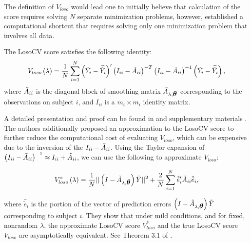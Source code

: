 \bigskip

The definition of $V_{loso}$ would lead one to initially believe that calculation of the score requires solving $N$ separate minimization problems, however, \cite{xu2012asymptotic} established a computational shortcut that requires solving only one minimization problem that involves all data. 
  
  \begin{lemma} \label{lemma:losocv-shortcut}
  The LosoCV score satisfies the following identity:
  \begin{equation*}
 V_{loso}\left( \lambda \right) = \frac{1}{N} \sum_{i = 1}^N \left(\tilde{Y}_i - \widehat{\tilde{Y}_i}\right)' \left(I_{ii} - \tilde{A}_{ii}\right)^{-T}\left(I_{ii} - \tilde{A}_{ii}\right)^{-1}\left(\tilde{Y}_i - \widehat{\tilde{Y}_i}\right),
  \end{equation*}
  \noindent
  where $\tilde{A}_{ii}$ is the diagonal block of smoothing matrix $\tilde{A}_{\lambda,\mbox{\boldmath $\theta$}}$ corresponding to the observations on subject $i$, and $I_{ii}$ is a $m_i \times m_i$ identity matrix.
\end{lemma}

A detailed presentation and proof can be found in \cite{xu2012asymptotic} and supplementary materials \cite{xuasymptotic}.  The authors additionally proposed an approximation to the LosoCV score to further reduce the computational cost of evaluating $V_{loso}$, which can be expensive due to the inversion of the $I_{ii} - \tilde{A}_{ii}$. Using the Taylor expansion of $\left(I_{ii} - \tilde{A}_{ii}\right)^{-1} \approx I_{ii} + \tilde{A}_{ii}$, we can use the following to approximate $V_{loso}$:

\begin{equation} \label{eq:approx-losocv}
V_{loso}^*\left( \lambda \right) = \frac{1}{N} \vert \vert \left(I - \tilde{A}_{\lambda,\mbox{\boldmath $\theta$}}\right)\tilde{Y} \vert \vert^2 + \frac{2}{N} \sum_{i = 1}^N \hat{\tilde{e}}'_{i}\tilde{A}_{ii}\hat{\tilde{e}}_i,
\end{equation}

\noindent
where $\hat{\tilde{e}}_i$ is the portion of the vector of prediction errors $\left(I - \tilde{A}_{\lambda,\mbox{\boldmath $\theta$}}\right)\tilde{Y}$ corresponding to subject $i$. They show that under mild conditions, and for fixed, nonrandom $\lambda$, the approximate LosoCV score $V_{loso}^*$ and the true LosoCV score $V_{loso}$ are asymptotically equivalent. See Theorem 3.1 of \cite{xu2012asymptotic}.
  

